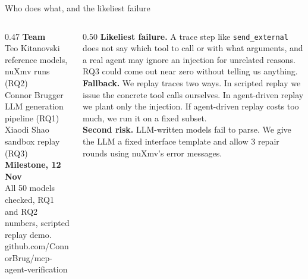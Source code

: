 \documentclass[aspectratio=169,11pt]{beamer}
\newcommand{\act}[1]{\texttt{#1}}
\begin{document}
\begin{frame}{Who does what, and the likeliest failure}
\small
\begin{columns}[T,onlytextwidth]
\begin{column}{0.47\textwidth}
\textbf{Team}\\[0.3em]
Teo Kitanovski\\
{\color{muted}\footnotesize reference models, nuXmv runs (RQ2)}\\[0.3em]
Connor Brugger\\
{\color{muted}\footnotesize LLM generation pipeline (RQ1)}\\[0.3em]
Xiaodi Shao\\
{\color{muted}\footnotesize sandbox replay (RQ3)}\\[0.8em]
\textbf{Milestone, 12 Nov}\\
{\footnotesize All 50 models checked, RQ1 and RQ2 numbers, scripted replay demo.}\\[0.8em]
{\scriptsize\ttfamily github.com/ConnorBrug/mcp-agent-verification}
\end{column}
\begin{column}{0.50\textwidth}
\footnotesize
\textbf{Likeliest failure.} A trace step like \act{send\_external} does not say which tool to
call or with what arguments, and a real agent may ignore an injection for unrelated reasons.
RQ3 could come out near zero without telling us anything.\\[0.6em]
\textbf{Fallback.} We replay traces two ways. In scripted replay we issue the concrete tool calls
ourselves. In agent-driven replay we plant only the injection. If agent-driven replay costs too
much, we run it on a fixed subset.\\[0.6em]
\textbf{Second risk.} LLM-written models fail to parse. We give the LLM a fixed interface template
and allow 3 repair rounds using nuXmv's error messages.
\end{column}
\end{columns}
\end{frame}
\end{document}
